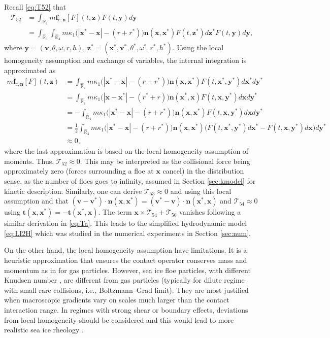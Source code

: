 \documentclass[a4paper,11pt]{article}
\numberwithin{equation}{section}
\theoremstyle{definition}
\newcommand{\bfx}{\boldsymbol{x}}
\newcommand{\bfz}{\boldsymbol{z}}
\newcommand{\bfy}{\boldsymbol{y}}
\newcommand{\bfv}{\boldsymbol{v}}
\newcommand{\bfn}{\boldsymbol{n}}
\newcommand{\bft}{\boldsymbol{t}}
\newcommand{\bff}{\boldsymbol{f}}
\newcommand{\bbr}{\mathbb R}
\newcommand{\T}{\mathcal{T}}
\begin{document}
Recall \eqref{eq:T52} that 
\begin{align*}
\T_{52}
& = \int_{\hat{\bbr}_3} m \bff_{c,\bfn}[F](t,\bfz) F(t,\bfy) d\bfy \\
& = \int_{\hat{\bbr}_3}\int_{\hat{\bbr}_4}
m \kappa_1\big(|\bfx^*-\bfx|-(r+r^*)\big) \bfn(\bfx,\bfx^*) 
F(t,\bfz^*) d\bfz^* F(t,\bfy) d\bfy, \nonumber
\end{align*}
where $\bfy=(\bfv,\theta, \omega, r,h)$, $\bfz^*=(\bfx^*,\bfv^*,\theta^*, \omega^*,r^*, h^*)$.
%
Using the local homogeneity assumption and exchange of variables, 
the internal integration is approximated as
\begin{align*}
m \bff_{c,\bfn}[F](t,\bfz) & =
\int_{\hat{\bbr}_4}
m \kappa_1\big(|\bfx^*-\bfx|  -(r+r^*)\big) \bfn(\bfx,\bfx^*) 
F(t,\bfx^*, \bfy^*) d\bfx^* d\bfy^* \\
& = \int_{\hat{\bbr}_4}
m \kappa_1\big(|\bfx-\bfx^*|  -(r^*+r)\big) \bfn(\bfx^*,\bfx) 
F(t,\bfx, \bfy^*) d\bfx d\bfy^* \\
& = - \int_{\hat{\bbr}_4}
m \kappa_1\big(|\bfx^*-\bfx|  -(r+r^*)\big) \bfn(\bfx,\bfx^*) 
F(t,\bfx, \bfy^*) d\bfx d\bfy^* \\
& = \frac{1}{2}\int_{\hat{\bbr}_4}
m \kappa_1\big(|\bfx^*-\bfx|  -(r+r^*)\big) \bfn(\bfx,\bfx^*) 
\big( F(t,\bfx^*, \bfy^*) d\bfx^* - F(t,\bfx, \bfy^*) d\bfx \big) d\bfy^* \\
& \approx 0,
\end{align*}
where the last approximation is based on the local homogeneity assumption of moments. Thus, $\T_{52}\approx 0.$ 
This may be interpreted as the collisional force being approximately zero (forces surrounding a floe at $\bfx$ cancel) in the distribution sense, as the number of floes goes to infinity, assumed in Section \ref{sec:kmodel} for kinetic description.
%
Similarly, one can derive $\T_{53} \approx 0$ and using this local assumption and that $(\bfv  - \bfv^*) \cdot \bfn(\bfx, \bfx^*) = (\bfv^*  - \bfv) \cdot \bfn(\bfx^*, \bfx)$ and $\T_{54} \approx 0$ using $\bft(\bfx, \bfx^*) = - \bft(\bfx^*, \bfx)$.
The term $\bfx \times \T_{54} + \T_{56}$ vanishes following a similar derivation in \eqref{eq:Ta}. This leads to the simplified hydrodynamic model \eqref{eq:LI2H} which was studied in the numerical experiments in Section \ref{sec:num}.


On the other hand, the local homogeneity assumption have limitations. 
It is a heuristic approximation that ensures the contact operator conserves mass and momentum as in  \cite{bardos1991fluid,golse2003mean,golse2005boltzmann} for gas particles. 
However, sea ice floe particles, with different Knudsen number \cite{karniadakis2005microflows}, are different from gas particles (typically for dilute regime with small rare collisions, i.e., Boltzmann–Grad limit).  
They are most justified when macroscopic gradients vary on scales much larger than the contact interaction range. 
%
In regimes with strong shear or boundary effects, deviations from local homogeneity should be considered and this would lead to more realistic sea ice rheology \cite{shen1987role,feltham2008sea,herman2022granular}.
\end{document}
